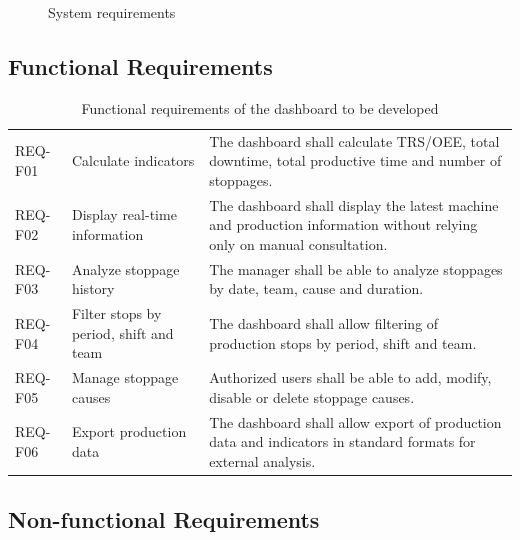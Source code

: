 \begin{figure}[H]
\centering
{}
\caption{System requirements }
\label{fig:chapter1-5}
\end{figure}

\subsection{\fontsize{14}{17}\selectfont Functional Requirements}

\begin{table}[H]
\centering
\caption{Functional requirements of the dashboard to be developed}
\begin{tabularx}{\textwidth}{|P{0.16\textwidth}|P{0.27\textwidth}|Y|}
\hline
{}
 &  &  \\
\hline
REQ-F01 & Calculate indicators & The dashboard shall calculate TRS/OEE, total downtime, total productive time and number of stoppages. \\
\hline
REQ-F02 & Display real-time information & The dashboard shall display the latest machine and production information without relying only on manual consultation. \\
\hline
REQ-F03 & Analyze stoppage history & The manager shall be able to analyze stoppages by date, team, cause and duration. \\
\hline
REQ-F04 & Filter stops by period, shift and team & The dashboard shall allow filtering of production stops by period, shift and team. \\
\hline
REQ-F05 & Manage stoppage causes & Authorized users shall be able to add, modify, disable or delete stoppage causes. \\
\hline
REQ-F06 & Export production data & The dashboard shall allow export of production data and indicators in standard formats for external analysis. \\
\hline
\end{tabularx}
\label{tab:chapter1-1}
\end{table}

\subsection{\fontsize{14}{17}\selectfont Non-functional Requirements}

